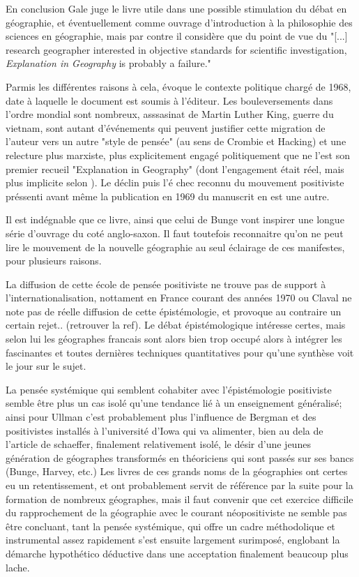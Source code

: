 {En conclusion Gale juge le livre utile dans une possible stimulation du débat en géographie, et éventuellement comme ouvrage d'introduction à la philosophie des sciences en géographie, mais par contre il considère que du point de vue du "[...] research geographer interested in objective standards for scientific investigation, \textit{Explanation in Geography} is probably a failure." \autocite[316]{Gale1972}

Parmis les différentes raisons à cela, \autocite{Barnes2006} évoque le contexte politique chargé de 1968, date à laquelle le document est soumis à l'éditeur. Les bouleversements dans l'ordre mondial sont nombreux, asssasinat de Martin Luther King, guerre du vietnam, sont autant d'événements qui peuvent justifier cette migration de l'auteur vers un autre "style de pensée" (au sens de Crombie et Hacking) \autocite{Barnes2006} et une relecture plus marxiste, plus explicitement engagé politiquement que ne l'est son premier recueil "Explanation in Geography" (dont l'engagement était réel, mais plus implicite selon \autocite{Johnston2008}). Le déclin puis l'é                                                                       chec reconnu du mouvement positiviste préssenti avant même la publication en 1969 du manuscrit en est une autre. \autocite[47]{Barnes2006}

Il est indégnable que ce livre, ainsi que celui de Bunge vont inspirer une longue série d'ouvrage du coté anglo-saxon. Il faut toutefois reconnaitre qu'on ne peut lire le mouvement de la nouvelle géographie au seul éclairage de ces manifestes, pour plusieurs raisons. 

La diffusion de cette école de pensée positiviste ne trouve pas de support à l'internationalisation, nottament en France courant des années 1970 ou Claval ne note pas de réelle diffusion de cette épistémologie, et provoque au contraire un certain rejet.. (retrouver la ref). Le débat épistémologique intéresse certes, mais selon lui les géographes francais sont alors bien trop occupé alors à intégrer les fascinantes et toutes dernières techniques quantitatives pour qu'une synthèse voit le jour sur le sujet.\autocite[27-29]{Claval2003}

La pensée systémique qui semblent cohabiter avec l'épistémologie positiviste semble être plus un cas isolé qu'une tendance lié à un enseignement généralisé; ainsi pour Ullman c'est probablement plus l'influence de Bergman et des positivistes installés à l'université d'Iowa qui va alimenter, bien au dela de l'article de schaeffer, finalement relativement isolé, le désir d'une jeunes génération de géographes transformés en théoriciens qui sont passés sur ses bancs (Bunge, Harvey, etc.) \autocite{Ullman (a verifier)} Les livres de ces grands noms de la géographies ont certes eu un retentissement, et ont probablement servit de référence par la suite pour la formation de nombreux géographes, mais il faut convenir que cet exercice difficile du rapprochement de la géographie avec le courant néopositiviste ne semble pas être concluant, tant la pensée systémique, qui offre un cadre méthodolique et instrumental assez rapidement s'est ensuite largement surimposé, englobant la démarche hypothético déductive dans une acceptation finalement beaucoup plus lache.

}
